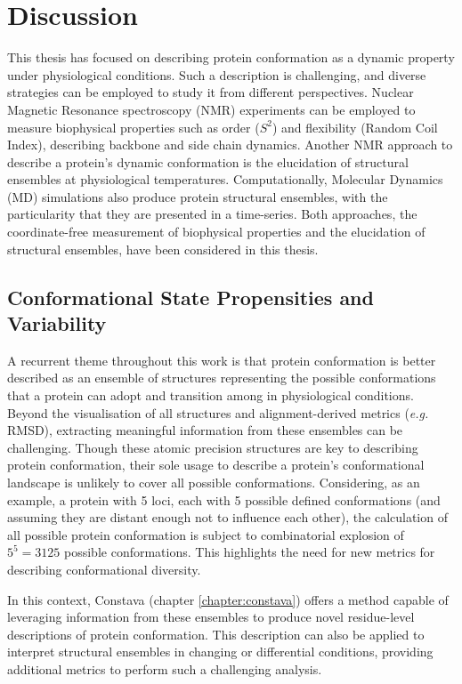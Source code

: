 \chapter{Discussion}
\newpage

This thesis has focused on describing protein conformation as a dynamic property under physiological conditions. Such a description is challenging, and diverse strategies can be employed to study it from different perspectives. Nuclear Magnetic Resonance spectroscopy (NMR) experiments can be employed to measure biophysical properties such as order ($S^{2}$) and flexibility (Random Coil Index), describing backbone and side chain dynamics. Another NMR approach to describe a protein's dynamic conformation is the elucidation of structural ensembles at physiological temperatures. Computationally, Molecular Dynamics (MD) simulations also produce protein structural ensembles, with the particularity that they are presented in a time-series. Both approaches, the coordinate-free measurement of biophysical properties and the elucidation of structural ensembles, have been considered in this thesis. 

\section{Conformational State Propensities and Variability}

A recurrent theme throughout this work is that protein conformation is better described as an ensemble of structures representing the possible conformations that a protein can adopt and transition among in physiological conditions. Beyond the visualisation of all structures and alignment-derived metrics (\textit{e.g.} RMSD), extracting meaningful information from these ensembles can be challenging. Though these atomic precision structures are key to describing protein conformation, their sole usage to describe a protein's conformational landscape is unlikely to cover all possible conformations. Considering, as an example, a protein with 5 loci, each with 5 possible defined conformations (and assuming they are distant enough not to influence each other), the calculation of all possible protein conformation is subject to combinatorial explosion of $5^{5}=3125$ possible conformations. This highlights the need for new metrics for describing conformational diversity.

In this context, Constava (chapter \ref{chapter:constava}) \cite{gavalda-garcia_data-driven_2024} offers a method capable of leveraging information from these ensembles to produce novel residue-level descriptions of protein conformation. This description can also be applied to interpret structural ensembles in changing or differential conditions, providing additional metrics to perform such a challenging analysis.

